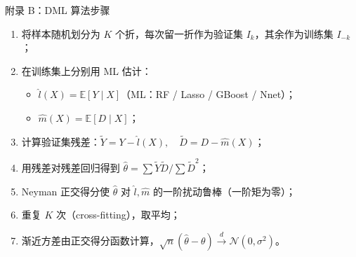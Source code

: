 \documentclass[aspectratio=169,10pt]{ctexbeamer}
\begin{document}
\begin{frame}{附录 B：DML 算法步骤}
  \small
  \begin{enumerate}
    \item 将样本随机划分为 $K$ 个折，每次留一折作为验证集 $I_k$，其余作为训练集 $I_{-k}$；
    \item 在训练集上分别用 ML 估计：
      \begin{itemize}\footnotesize
        \item $\hat l(X)=\mathbb E[Y\mid X]$（ML：RF / Lasso / GBoost / Nnet）；
        \item $\hat m(X)=\mathbb E[D\mid X]$；
      \end{itemize}
    \item 计算验证集残差：$\tilde Y = Y - \hat l(X),\quad \tilde D = D - \hat m(X)$；
    \item 用残差对残差回归得到 $\hat\theta=\sum \tilde Y\tilde D / \sum \tilde D^2$；
    \item Neyman 正交得分使 $\hat\theta$ 对 $\hat l,\hat m$ 的一阶扰动\alert{鲁棒}（一阶矩为零）；
    \item 重复 $K$ 次（cross-fitting），取平均；
    \item 渐近方差由正交得分函数计算，$\sqrt{n}(\hat\theta-\theta)\xrightarrow{d}\mathcal N(0,\sigma^2)$。
  \end{enumerate}
\end{frame}
\end{document}
